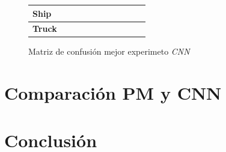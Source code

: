\documentclass{uc3mpracticas}
\begin{document}
\begin{figure}[!h]
\begin{center}
\begin{tabular}{|g|c|c|c|c|c|c|c|c|c|c|}
            \textbf{Ship}                   &                 &                   &             &            &             &            &             &              &             &                \\ \hline
            \textbf{Truck}                  &                 &                   &             &            &             &            &             &              &             &                \\ \hline
      \end{tabular}
\end{center}
\caption*{Matriz de confusión mejor experimeto \textit{CNN}}
\end{figure}

\section{Comparación PM y CNN}




\section{Conclusión}
\end{document}
